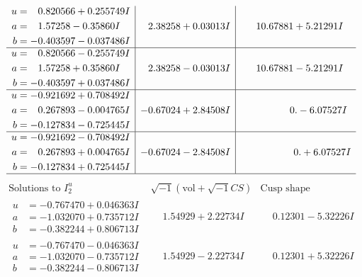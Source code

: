\documentclass[1p]{elsarticle_modified}
\theoremstyle{definition}
\newcommand{\I}{\sqrt{-1}}
\begin{document}
$$\begin{array}{c|c|c}
\begin{aligned}
u &= \phantom{-}0.820566 + 0.255749 I \\
a &= \phantom{-}1.57258 - 0.35860 I \\
b &= -0.403597 - 0.037486 I\end{aligned}
 & \phantom{-}2.38258 + 0.03013 I & \phantom{-}10.67881 + 5.21291 I \\ \hline\begin{aligned}
u &= \phantom{-}0.820566 - 0.255749 I \\
a &= \phantom{-}1.57258 + 0.35860 I \\
b &= -0.403597 + 0.037486 I\end{aligned}
 & \phantom{-}2.38258 - 0.03013 I & \phantom{-}10.67881 - 5.21291 I \\ \hline\begin{aligned}
u &= -0.921692 + 0.708492 I \\
a &= \phantom{-}0.267893 - 0.004765 I \\
b &= -0.127834 - 0.725445 I\end{aligned}
 & -0.67024 + 2.84508 I & \phantom{-0.000000 } 0. - 6.07527 I \\ \hline\begin{aligned}
u &= -0.921692 - 0.708492 I \\
a &= \phantom{-}0.267893 + 0.004765 I \\
b &= -0.127834 + 0.725445 I\end{aligned}
 & -0.67024 - 2.84508 I & \phantom{-0.000000 -}0. + 6.07527 I\\
 \hline 
 \end{array}$$\newpage$$\begin{array}{c|c|c}  
\text{Solutions to }I^u_{2}& \I (\text{vol} + \sqrt{-1}CS) & \text{Cusp shape}\\
 \hline 
\begin{aligned}
u &= -0.767470 + 0.046363 I \\
a &= -1.032070 + 0.735712 I \\
b &= -0.382244 + 0.806713 I\end{aligned}
 & \phantom{-}1.54929 + 2.22734 I & \phantom{-}0.12301 - 5.32226 I \\ \hline\begin{aligned}
u &= -0.767470 - 0.046363 I \\
a &= -1.032070 - 0.735712 I \\
b &= -0.382244 - 0.806713 I\end{aligned}
 & \phantom{-}1.54929 - 2.22734 I & \phantom{-}0.12301 + 5.32226 I \\ \hline\begin{aligned}

\end{aligned}
\end{array}$$
\end{document}

